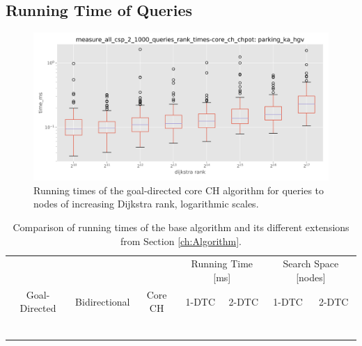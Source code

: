 \subsection{Running Time of Queries}
\begin{figure}[hbtp]
	\centering
	\includegraphics[width=.95\textwidth]{plots/measure_all_csp_2_1000_queries_rank_times-core_ch_chpot-time_ms.png}
	\caption{Running times of the goal-directed core CH algorithm for queries to nodes of increasing Dijkstra rank, logarithmic scales.}
	\label{fig:rank_times}
\end{figure}

\begin{table}[hbtp]
	\centering
	\begin{tabular}{ccccccc}
		\toprule
		              &               &         & \multicolumn{2}{c}{Running Time [\si{\milli\second}]} & \multicolumn{2}{c}{Search Space [nodes]}                 \\
		Goal-Directed & Bidirectional & Core CH & 1-DTC                                                 & 2-DTC                                    & 1-DTC & 2-DTC \\
		\midrule
		\xmark        & \xmark        & \xmark  &                                                       &                                          &       &       \\
		\cmark        & \xmark        & \xmark  &                                                       &                                          &       &       \\
		\xmark        & \cmark        & \xmark  &                                                       &                                          &       &       \\
		\cmark        & \cmark        & \xmark  &                                                       &                                          &       &       \\
		\xmark        & \cmark        & \cmark  &                                                       &                                          &       &       \\
		\cmark        & \cmark        & \cmark  &                                                       &                                          &       &       \\
		\bottomrule
	\end{tabular}
	\caption{Comparison of running times of the base algorithm and its different extensions from Section \ref{ch:Algorithm}.}
	\label{tbl:extensions_runtime}
\end{table}


